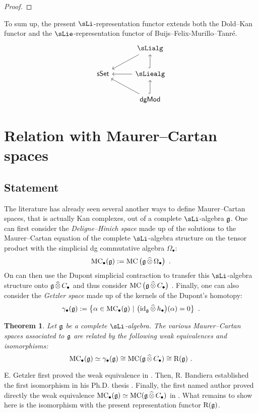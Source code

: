 \documentclass[twoside, 10pt]{amsart}
\newtheorem{theorem}[lemma]{Theorem}
\begin{document}
\begin{proof}

\end{proof}

To sum up, the present $\sLi$-representation functor extends both the Dold--Kan functor and the $\sLie$-representation functor of Buijs--Felix-Murillo--Tanr\'e. 
\[
\vcenter{\hbox{
\begin{tikzcd}[column sep=1cm, row sep=0.7cm]
& \sLialg\arrow[dl]\\
\sSe& \sLiealg\arrow[l]\arrow[u, hookrightarrow]\\
&\mathsf{dg Mod}\arrow[lu]\arrow[u, hookrightarrow]
\end{tikzcd}
}}
\]



\section{Relation with Maurer--Cartan spaces \daniel{[Daniel]}}

\subsection{Statement}
The literature has already seen several another ways to define Maurer--Cartan spaces, that is actually Kan complexes, out of a complete $\sLi$-algebra $\mathfrak{g}$. One can first consider the \emph{Deligne--Hinich space} \cite{Hinich97bis} made up of the solutions to the Maurer--Cartan equation of the complete $\sLi$-algebra structure on the tensor product with the simplicial dg commutative algebra $\Omega_\bullet$:
\[\mathrm{MC}_\bullet(\mathfrak{g}):=\mathrm{MC}\left(\mathfrak{g} \, \widehat{\otimes}\, \Omega_\bullet\right)\ .\]
On can then use the Dupont simplicial contraction to transfer this $\sLi$-algebra structure onto $\mathfrak{g}\,\widehat{\otimes} \,C_\bullet$ and thus consider $\mathrm{MC}\left(\mathfrak{g}\, \widehat{\otimes}\, C_\bullet\right)$ . Finally, one can also consider the \emph{Getzler space} \cite{Getzler09} made up of the kernels of the Dupont's homotopy:
\[\gamma_\bullet(\g):=\left\{
\alpha \in \MC_\bullet(\g)\ | \ 
\big(\id_\g\,\widehat{\otimes}\,h_\bullet\big)(\alpha)=0
\right\}\ .\]

\begin{theorem}\label{thm:MainIsos}
Let $\mathfrak{g}$ be a complete $\sLi$-algebra. The various Maurer--Cartan spaces associated to $\mathfrak{g}$ are related by the following weak equivalences and isomorphisms:
\[\MC_\bullet(\g) \simeq  \gamma_\bullet(\g)  \cong \MC(\g\,\widehat{\otimes}\, C_\bullet)  \cong \R(\g)\ .
\]
\end{theorem}
E. Getzler first proved the weak equivalence in \cite{Getzler09}. Then, R. Bandiera established the first isomorphism in his Ph.D. thesis \cite{Bandiera14}. Finally, the first named author proved directly the weak equivalence $\mathrm{MC}_\bullet(\mathfrak{g}) \simeq \mathrm{MC}(\mathfrak{g}\,\widehat{\otimes}\, C_\bullet)$ in \cite{rn17cosimplicial}. What remains to show here is the isomorphism with the present representation functor $\mathrm{R}(\mathfrak{g})$. 
\end{document}
